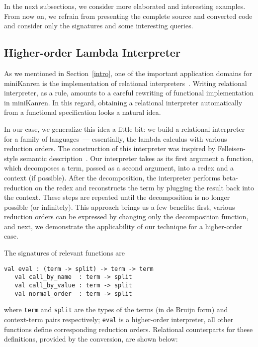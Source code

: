 In the next subsections, we consider more elaborated and interesting examples. From now on, we refrain from presenting the complete source and
converted code and consider only the signatures and some interesting queries. 

\subsection{Higher-order Lambda Interpreter}

As we mentioned in Section~\ref{intro}, one of the important application domains for miniKanren is the implementation of relational interpreters~\cite{WillThesis,unified,Untagged}. 
Writing relational interpreter, as a rule, amounts to a careful rewriting of functional implementation in miniKanren. In this regard, obtaining a relational
interpreter automatically from a functional specification looks a natural idea.

In our case, we generalize this idea a little bit: we build a relational interpreter for a family of languages~--- essentially, the lambda calculus with
various reduction orders. The construction of this interpreter was inspired by Felleisen-style semantic description~\cite{Felleisen}. 
Our interpreter takes as its first argument a function, which decomposes a term, passed as a second argument, into a redex and a context (if possible). 
After the decomposition, the interpreter performs beta-reduction on the redex and reconstructs the term by plugging the result back into the context. 
These steps are repeated until the decomposition is no longer possible (or infinitely). This approach brings us a few benefits: first, various reduction orders can be 
expressed by changing only the decomposition function, and next, we demonstrate the applicability of our technique for a higher-order case.

The signatures of relevant functions are

\begin{lstlisting}[basicstyle=\small]
   val eval : (term -> split) -> term -> term
   val call_by_name  : term -> split
   val call_by_value : term -> split
   val normal_order  : term -> split
\end{lstlisting}

\noindent where \lstinline|term| and \lstinline|split| are the types of the terms (in de Bruijn form) and context-term pairs respectively; \lstinline|eval| 
is a higher-order interpreter, all other functions define corresponding reduction orders. Relational counterparts for these definitions, provided 
by the conversion, are shown below:

